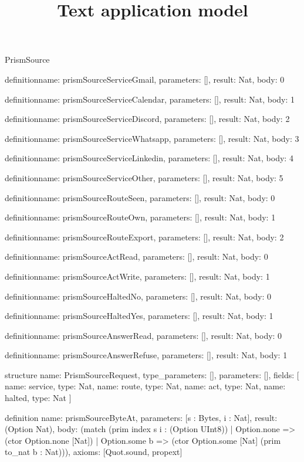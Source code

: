\begin{lexlean}{PrismSource}
\title{Text application model}
\begin{semanticmodule}
definition{name: prismSourceServiceGmail, parameters: [], result: Nat, body: 0}

definition{name: prismSourceServiceCalendar, parameters: [], result: Nat, body: 1}

definition{name: prismSourceServiceDiscord, parameters: [], result: Nat, body: 2}

definition{name: prismSourceServiceWhatsapp, parameters: [], result: Nat, body: 3}

definition{name: prismSourceServiceLinkedin, parameters: [], result: Nat, body: 4}

definition{name: prismSourceServiceOther, parameters: [], result: Nat, body: 5}

definition{name: prismSourceRouteSeen, parameters: [], result: Nat, body: 0}

definition{name: prismSourceRouteOwn, parameters: [], result: Nat, body: 1}

definition{name: prismSourceRouteExport, parameters: [], result: Nat, body: 2}

definition{name: prismSourceActRead, parameters: [], result: Nat, body: 0}

definition{name: prismSourceActWrite, parameters: [], result: Nat, body: 1}

definition{name: prismSourceHaltedNo, parameters: [], result: Nat, body: 0}

definition{name: prismSourceHaltedYes, parameters: [], result: Nat, body: 1}

definition{name: prismSourceAnswerRead, parameters: [], result: Nat, body: 0}

definition{name: prismSourceAnswerRefuse, parameters: [], result: Nat, body: 1}

structure{
  name: PrismSourceRequest,
  type_parameters: [],
  parameters: [],
  fields: [
    {name: service, type: Nat},
    {name: route, type: Nat},
    {name: act, type: Nat},
    {name: halted, type: Nat}
  ]
}

definition{
  name: prismSourceByteAt,
  parameters: [s : Bytes, i : Nat],
  result: (Option Nat),
  body: (match (prim index s i : (Option UInt8))
    | Option.none => (ctor Option.none [Nat])
    | Option.some b => (ctor Option.some [Nat] (prim to_nat b : Nat))),
  axioms: [Quot.sound, propext]
}


\end{semanticmodule}
\end{lexlean}
